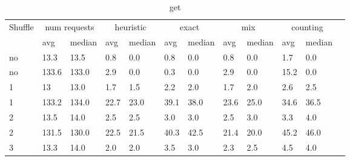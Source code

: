 \documentclass[12pt,a4paper]{report}
\begin{document}
\begin{table}[h]
	\centering
	\caption{get}
	\label{tab:get}
	\begin{tabular}{|l|l|l|l|l|l|l|l|l|l|l|l|}
		\hline
		\multirow{2}{*}{Shuffle} & \multicolumn{2}{|c|}{num requests} & \multicolumn{2}{|c|}{heuristic} & \multicolumn{2}{|c|}{exact} & \multicolumn{2}{|c|}{mix} & \multicolumn{2}{|c|}{counting}                                          \\ \cline{2-11}
		                         & avg                                & median                          & avg                         & median                    & avg                            & median & avg  & median & avg  & median \\ \hline
		no                       & 13.3                               & 13.5                            & 0.8                         & 0.0                       & 0.8                            & 0.0    & 0.8  & 0.0    & 1.7  & 0.0    \\ \hline
		no                       & 133.6                              & 133.0                           & 2.9                         & 0.0                       & 0.3                            & 0.0    & 2.9  & 0.0    & 15.2 & 0.0    \\ \hline
		1                        & 13                                 & 13.0                            & 1.7                         & 1.5                       & 2.2                            & 2.0    & 1.7  & 2.0    & 2.6  & 2.5    \\ \hline
		1                        & 133.2                              & 134.0                           & 22.7                        & 23.0                      & 39.1                           & 38.0   & 23.6 & 25.0   & 34.6 & 36.5   \\ \hline
		2                        & 13.5                               & 14.0                            & 2.5                         & 2.5                       & 3.0                            & 3.0    & 2.5  & 3.0    & 3.3  & 4.0    \\ \hline
		2                        & 131.5                              & 130.0                           & 22.5                        & 21.5                      & 40.3                           & 42.5   & 21.4 & 20.0   & 45.2 & 46.0   \\ \hline
		3                        & 13.3                               & 14.0                            & 2.0                         & 2.0                       & 3.5                            & 3.0    & 2.3  & 2.5    & 4.5  & 4.0    \\ \hline

\end{tabular}
\end{table}
\end{document}
